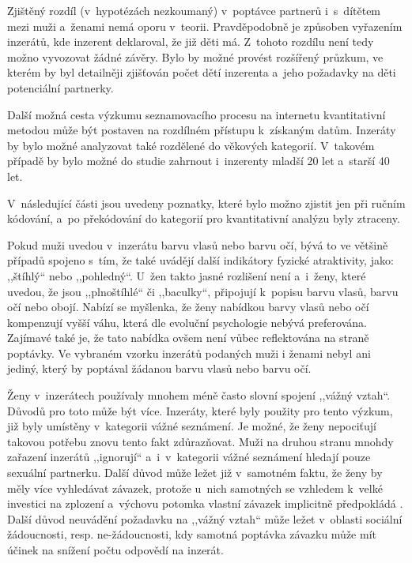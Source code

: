 \documentclass[a4paper, 12pt, notitlepage, oneside, numbers=noenddot]{report}
\begin{document}
Zjištěný rozdíl (v~hypotézách nezkoumaný) v~poptávce partnerů
i~s~dítětem mezi muži a~ženami nemá oporu v~teorii.  Pravděpodobně je
způsoben vyřazením inzerátů, kde inzerent deklaroval, že již děti má.
Z~tohoto rozdílu není tedy možno vyvozovat žádné závěry.  Bylo by
možné provést rozšířený průzkum, ve kterém by byl detailněji zjišťován
počet dětí inzerenta a~jeho požadavky na děti potenciální partnerky.

Další možná cesta výzkumu seznamovacího procesu na internetu
kvantitativní metodou může být postaven na rozdílném přístupu
k~získaným datům.  Inzeráty by bylo možné analyzovat také rozdělené do
věkových kategorií.  V~takovém případě by bylo možné do studie
zahrnout i~inzerenty mladší 20 let a~starší 40 let.

V~následující části jsou uvedeny poznatky, které bylo možno zjistit
jen při ručním kódování, a~po překódování do kategorií pro
kvantitativní analýzu byly ztraceny.

Pokud muži uvedou v~inzerátu barvu vlasů nebo barvu očí, bývá to ve
většině případů spojeno s~tím, že také uvádějí další indikátory
fyzické atraktivity, jako: ,,štíhlý`` nebo ,,pohledný``. U~žen takto
jasné rozlišení není a~i~ženy, které uvedou, že jsou ,,plnoštíhlé``
či ,,baculky``, připojují k~popisu barvu vlasů, barvu očí nebo
obojí. Nabízí se myšlenka, že ženy nabídkou barvy vlasů nebo očí
kompenzují vyšší váhu, která dle evoluční psychologie nebývá
preferována.  Zajímavé také je, že tato nabídka ovšem není vůbec
reflektována na straně poptávky.  Ve vybraném vzorku inzerátů podaných
muži i ženami nebyl ani jediný, který by poptával žádanou barvu
vlasů nebo barvu očí.

Ženy v~inzerátech používaly mnohem méně často slovní spojení ,,vážný
vztah``.  Důvodů pro toto může být více.  Inzeráty, které byly použity
pro tento výzkum, již byly umístěny v~kategorii vážné seznámení.  Je
možné, že ženy nepociťují takovou potřebu znovu tento fakt
zdůrazňovat.  Muži na druhou stranu mnohdy zařazení inzerátů
,,ignorují`` a~i~v~ka\-te\-gorii vážné seznámení hledají pouze sexuální
partnerku.  Další důvod může ležet již v~samotném faktu, že ženy by
měly více vyhledávat závazek, protože u~nich samotných se vzhledem
k~velké investici na zplození a~výchovu potomka vlastní závazek
implicitně předpokládá \citep{Trivers1972}.  Další důvod neuvádění
požadavku na ,,vážný vztah`` může ležet v~oblasti sociální
žádoucnosti, resp. ne-žádoucnosti, kdy samotná poptávka závazku může
mít účinek na snížení počtu odpovědí na inzerát.
\end{document}
